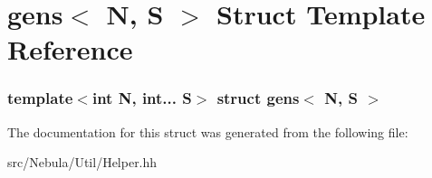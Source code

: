\hypertarget{structgens}{\section{gens$<$ \-N, \-S $>$ \-Struct \-Template \-Reference}
\label{structgens}
}
\subsubsection*{template$<$int \-N, int... \-S$>$ struct gens$<$ N, S $>$}



\-The documentation for this struct was generated from the following file\-:\begin{DoxyCompactItemize}
\item 
src/\-Nebula/\-Util/\-Helper.\-hh\end{DoxyCompactItemize}
